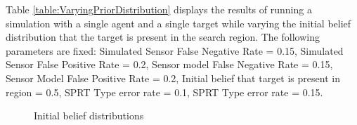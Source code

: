 Table \ref{table:VaryingPriorDistribution} displays the results of running a simulation with a single agent and a single target while varying the initial belief distribution that the target is present in the search region. The following parameters are fixed: Simulated Sensor False Negative Rate = 0.15, Simulated Sensor False Positive Rate = 0.2, Sensor model False Negative Rate = 0.15, Sensor Model False Positive Rate = 0.2, Initial belief that target is present in region = 0.5, SPRT Type  error rate = 0.1, SPRT Type  error rate = 0.15.
\begin{figure}
\centering
    \qquad
    \caption{Initial belief distributions}%
    \label{fig:initialBeliefDistribution}%
\end{figure}
